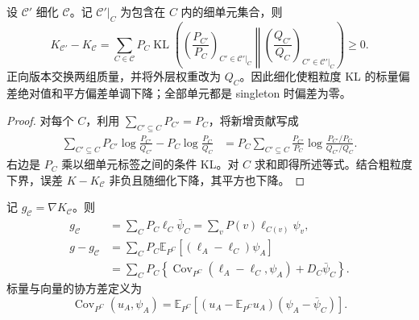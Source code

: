 \documentclass[lang=cn,scheme=chinese,openany]{../book/elegantbook}
\newcommand{\E}{\mathbb E}
\newcommand{\KL}{\operatorname{KL}}
\begin{document}
\begin{proposition}[分区细化的标量单调性]
\label{inf:prop:kl-partition-refinement}
设 $\mathcal C'$ 细化 $\mathcal C$。记 $\mathcal C'|_C$ 为包含在 $C$ 内的细单元集合，则
\begin{equation*}
 K_{\mathcal C'}-K_{\mathcal C}
 =\sum_{C\in\mathcal C}P_C
   \KL\left(
       \left(\frac{P_{C'}}{P_C}\right)_{C'\in\mathcal C'|_C}
       \middle\Vert
       \left(\frac{Q_{C'}}{Q_C}\right)_{C'\in\mathcal C'|_C}
      \right)\geq0.
\end{equation*}
正向版本交换两组质量，并将外层权重改为 $Q_C$。因此细化使粗粒度 KL 的标量偏差绝对值和平方偏差单调下降；全部单元都是 singleton 时偏差为零。
\end{proposition}

\begin{proof}
对每个 $C$，利用 $\sum_{C'\subseteq C}P_{C'}=P_C$，将新增贡献写成
\begin{align*}
 \sum_{C'\subseteq C}P_{C'}\log\frac{P_{C'}}{Q_{C'}}
    -P_C\log\frac{P_C}{Q_C}
 &=P_C\sum_{C'\subseteq C}\frac{P_{C'}}{P_C}
       \log\frac{P_{C'}/P_C}{Q_{C'}/Q_C}.
\end{align*}
右边是 $P_C$ 乘以细单元标签之间的条件 KL。对 $C$ 求和即得所述等式。结合粗粒度下界，误差 $K-K_{\mathcal C}$ 非负且随细化下降，其平方也下降。
\end{proof}

\begin{theorem}
\label{inf:thm:kl-partition-gradient}
记 $g_{\mathcal C}=\nabla K_{\mathcal C}$。则
\begin{align}
 g_{\mathcal C}
 &=\sum_CP_C\ell_C\bar \psi_C
  =\sum_vP(v)\ell_{C(v)}\psi_v,
 \label{inf:eq:kl-partition-gradient}\\
 g-g_{\mathcal C}
 &=\sum_CP_C\E_{P^C}[(\ell_A-\ell_C)\psi_A]
 \label{inf:eq:kl-partition-gradient-residual}\\
 &=\sum_CP_C\left\{
       \operatorname{Cov}_{P^C}(\ell_A-\ell_C,\psi_A)
       +D_C\bar \psi_C\right\}.
 \label{inf:eq:kl-partition-gradient-covariance}
\end{align}
标量与向量的协方差定义为
\begin{equation*}
 \operatorname{Cov}_{P^C}(u_A,\psi_A)
 =\E_{P^C}[(u_A-\E_{P^C}u_A)(\psi_A-\bar \psi_C)].
\end{equation*}
\end{theorem}
\end{document}
